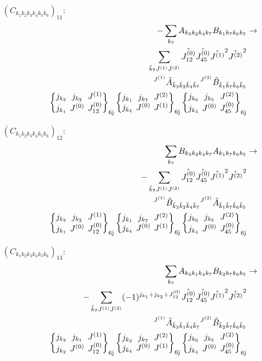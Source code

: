 \documentclass[11pt]{article}
\newcommand{\sixj}[6]{\begingroup\setlength{\arraycolsep}{0.2em}\begin{Bmatrix} #1 & #2 & #3 \\ #4 & #5 & #6 \end{Bmatrix}_{\text{6j}}\endgroup}
\begin{document}
$\left({C}_{{k}_{1}{k}_{2}{k}_{3}{k}_{4}{k}_{5}{k}_{6}}\right)_{11}$:
\begin{align}
-\sum_{{k}_{7}}{A}_{{k}_{3}{k}_{2}{k}_{4}{k}_{7}}{B}_{{k}_{1}{k}_{7}{k}_{6}{k}_{5}}&\rightarrow \notag \\\sum_{\tilde{k}_{7}J^{(1)}J^{(2)}}\hat{J^{(0)}_{12}}\hat{J^{(0)}_{45}}\hat{J^{(1)}}^{2}\hat{J^{(2)}}^{2}& \notag \\{}^{J^{(1)}}\tilde{A}_{\tilde{k}_{3}\tilde{k}_{2}\tilde{k}_{4}\tilde{k}_{7}}{}^{J^{(2)}}\tilde{B}_{\tilde{k}_{1}\tilde{k}_{7}\tilde{k}_{6}\tilde{k}_{5}}& \notag \\\sixj{j_{{k}_{3}}}{j_{{k}_{2}}}{J^{(1)}}{j_{{k}_{1}}}{J^{(0)}}{J^{(0)}_{12}}\sixj{j_{{k}_{1}}}{j_{{k}_{7}}}{J^{(2)}}{j_{{k}_{4}}}{J^{(0)}}{J^{(1)}}\sixj{j_{{k}_{6}}}{j_{{k}_{5}}}{J^{(2)}}{j_{{k}_{4}}}{J^{(0)}}{J^{(0)}_{45}}
\end{align}

$\left({C}_{{k}_{1}{k}_{2}{k}_{3}{k}_{4}{k}_{5}{k}_{6}}\right)_{12}$:
\begin{align}
\sum_{{k}_{7}}{B}_{{k}_{3}{k}_{2}{k}_{4}{k}_{7}}{A}_{{k}_{1}{k}_{7}{k}_{6}{k}_{5}}&\rightarrow \notag \\-\sum_{\tilde{k}_{7}J^{(1)}J^{(2)}}\hat{J^{(0)}_{12}}\hat{J^{(0)}_{45}}\hat{J^{(1)}}^{2}\hat{J^{(2)}}^{2}& \notag \\{}^{J^{(1)}}\tilde{B}_{\tilde{k}_{3}\tilde{k}_{2}\tilde{k}_{4}\tilde{k}_{7}}{}^{J^{(2)}}\tilde{A}_{\tilde{k}_{1}\tilde{k}_{7}\tilde{k}_{6}\tilde{k}_{5}}& \notag \\\sixj{j_{{k}_{3}}}{j_{{k}_{2}}}{J^{(1)}}{j_{{k}_{1}}}{J^{(0)}}{J^{(0)}_{12}}\sixj{j_{{k}_{1}}}{j_{{k}_{7}}}{J^{(2)}}{j_{{k}_{4}}}{J^{(0)}}{J^{(1)}}\sixj{j_{{k}_{6}}}{j_{{k}_{5}}}{J^{(2)}}{j_{{k}_{4}}}{J^{(0)}}{J^{(0)}_{45}}
\end{align}

$\left({C}_{{k}_{1}{k}_{2}{k}_{3}{k}_{4}{k}_{5}{k}_{6}}\right)_{13}$:
\begin{align}
\sum_{{k}_{7}}{A}_{{k}_{3}{k}_{1}{k}_{4}{k}_{7}}{B}_{{k}_{2}{k}_{7}{k}_{6}{k}_{5}}&\rightarrow \notag \\-\sum_{\tilde{k}_{7}J^{(1)}J^{(2)}}(-1)^{j_{{k}_{1}} +j_{{k}_{2}} +J^{(0)}_{12} }\hat{J^{(0)}_{12}}\hat{J^{(0)}_{45}}\hat{J^{(1)}}^{2}\hat{J^{(2)}}^{2}& \notag \\{}^{J^{(1)}}\tilde{A}_{\tilde{k}_{3}\tilde{k}_{1}\tilde{k}_{4}\tilde{k}_{7}}{}^{J^{(2)}}\tilde{B}_{\tilde{k}_{2}\tilde{k}_{7}\tilde{k}_{6}\tilde{k}_{5}}& \notag \\\sixj{j_{{k}_{3}}}{j_{{k}_{1}}}{J^{(1)}}{j_{{k}_{2}}}{J^{(0)}}{J^{(0)}_{12}}\sixj{j_{{k}_{2}}}{j_{{k}_{7}}}{J^{(2)}}{j_{{k}_{4}}}{J^{(0)}}{J^{(1)}}\sixj{j_{{k}_{6}}}{j_{{k}_{5}}}{J^{(2)}}{j_{{k}_{4}}}{J^{(0)}}{J^{(0)}_{45}}
\end{align}
\end{document}
